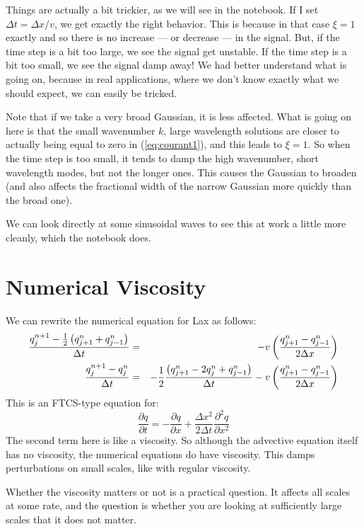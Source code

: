 Things are actually a bit trickier, as we will see in the notebook. If
I set $\Delta t = \Delta x / v$, we get exactly the right behavior.
This is because in that case $\xi=1$ exactly and so there is no
increase --- or decrease --- in the signal. But, if the time step is a
bit too large, we see the signal get unstable. If the time step is a
bit too small, we see the signal damp away! We had better understand
what is going on, because in real applications, where we don't know
exactly what we should expect, we can easily be tricked.

Note that if we take a very broad Gaussian, it is less affected. What
is going on here is that the small wavenumber $k$, large wavelength
solutions are closer to actually being equal to zero in
(\ref{eq:courant1}), and this leads to $\xi=1$. So when the time step
is too small, it tends to damp the high wavenumber, short wavelength
modes, but not the longer ones. This causes the Gaussian to broaden
(and also affects the fractional width of the narrow Gaussian more
quickly than the broad one). 

We can look directly at some sinusoidal waves to see this at work a
little more cleanly, which the notebook does.

\section{Numerical Viscosity}

We can rewrite the numerical equation for Lax as follows:
\begin{eqnarray}
  \frac{q_j^{n+1} - \frac{1}{2}\left(q_{j+1}^{n} +
    q_{j-1}^{n}\right)}{\Delta t} &=& - v \left(
  \frac{q_{j+1}^n - q_{j-1}^n}{2\Delta x}
  \right) \cr
  \frac{q_j^{n+1} - q_j^n}{\Delta t}
  &=& 
    - \frac{1}{2}\frac{\left(q_{j+1}^{n} - 2 q_j^{n} +
    q_{j-1}^{n}\right)}{\Delta t}
      - v \left(
  \frac{q_{j+1}^n - q_{j-1}^n}{2\Delta x}
  \right) 
\end{eqnarray}
This is an FTCS-type equation for:
\begin{equation}
  \frac{\partial q}{\partial t} = - \frac{\partial q}{\partial x}
  + \frac{\Delta x^2}{2\Delta t} \frac{\partial^2 q}{\partial x^2}
\end{equation}
The second term here is like a viscosity. So although the advective
equation itself has no viscosity, the numerical equations do have
viscosity. This damps perturbations on small scales, like with regular
viscosity. 

Whether the viscosity matters or not is a practical question. It
affects all scales at some rate, and the question is whether you are
looking at sufficiently large scales that it does not matter.

